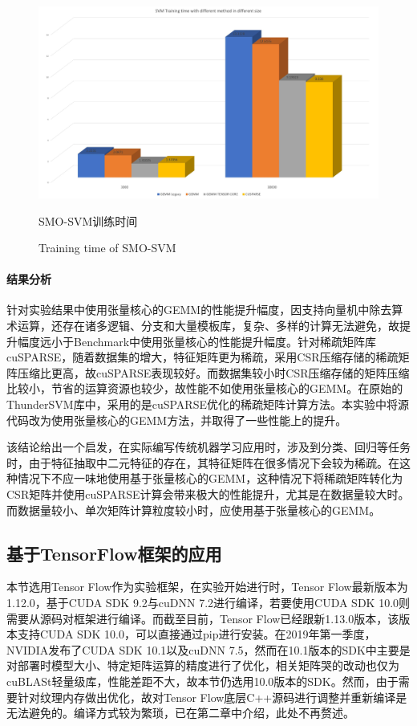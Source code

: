 \begin{figure}
	\centering
	\includegraphics[width=15cm]{figures/SMOSVMRES.jpg}
	\renewcommand{\thefigure}{\arabic{section}-\arabic{figure} }
	\renewcommand{\figurename}{图}
	\caption{SMO-SVM训练时间}
	\addtocounter{figure}{-1}
	\renewcommand{\thefigure}{\arabic{section}-\arabic{figure} }
	\renewcommand{\figurename}{Figure}
	\caption{Training time of SMO-SVM}
	\label{Fig-SMOSVMRES}
\end{figure}
\paragraph{结果分析}
\par 针对实验结果中使用张量核心的GEMM的性能提升幅度，因支持向量机中除去算术运算，还存在诸多逻辑、分支和大量模板库，复杂、多样的计算无法避免，故提升幅度远小于Benchmark中使用张量核心的性能提升幅度。针对稀疏矩阵库cuSPARSE，随着数据集的增大，特征矩阵更为稀疏，采用CSR压缩存储的稀疏矩阵压缩比更高，故cuSPARSE表现较好。而数据集较小时CSR压缩存储的矩阵压缩比较小，节省的运算资源也较少，故性能不如使用张量核心的GEMM。在原始的ThunderSVM库中，采用的是cuSPARSE优化的稀疏矩阵计算方法。本实验中将源代码改为使用张量核心的GEMM方法，并取得了一些性能上的提升。
\par 该结论给出一个启发，在实际编写传统机器学习应用时，涉及到分类、回归等任务时，由于特征抽取中二元特征的存在，其特征矩阵在很多情况下会较为稀疏。在这种情况下不应一味地使用基于张量核心的GEMM，这种情况下将稀疏矩阵转化为CSR矩阵并使用cuSPARSE计算会带来极大的性能提升，尤其是在数据量较大时。而数据量较小、单次矩阵计算粒度较小时，应使用基于张量核心的GEMM。
\subsection{基于TensorFlow框架的应用}
\par 本节选用Tensor Flow作为实验框架，在实验开始进行时，Tensor Flow最新版本为1.12.0，基于CUDA SDK 9.2与cuDNN 7.2进行编译，若要使用CUDA SDK 10.0则需要从源码对框架进行编译。而截至目前，Tensor Flow已经跟新1.13.0版本，该版本支持CUDA SDK 10.0，可以直接通过pip进行安装。在2019年第一季度，NVIDIA发布了CUDA SDK 10.1以及cuDNN 7.5，然而在10.1版本的SDK中主要是对部署时模型大小、特定矩阵运算的精度进行了优化，相关矩阵哭的改动也仅为cuBLASt轻量级库，性能差距不大，故本节仍选用10.0版本的SDK。然而，由于需要针对纹理内存做出优化，故对Tensor Flow底层C++源码进行调整并重新编译是无法避免的。编译方式较为繁琐，已在第二章中介绍，此处不再赘述。
